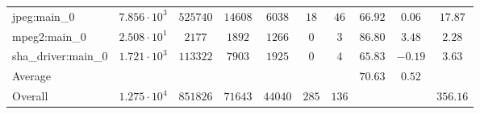 \begin{tabular}{|l|c|c|c|c|c|c|c|c|c|}
jpeg:main\_0            & $ 7.856 \cdot 10^{3} $ & $ 525740 $ & $ 14608 $ & $ 6038  $ & $ 18  $ & $ 46  $ & $ 66.92       $ & $ 0.06    $ & $ 17.87   $ \\
mpeg2:main\_0           & $ 2.508 \cdot 10^{1} $ & $ 2177   $ & $ 1892  $ & $ 1266  $ & $ 0   $ & $ 3   $ & $ 86.80       $ & $ 3.48    $ & $ 2.28    $ \\
sha\_driver:main\_0     & $ 1.721 \cdot 10^{3} $ & $ 113322 $ & $ 7903  $ & $ 1925  $ & $ 0   $ & $ 4   $ & $ 65.83       $ & $ -0.19   $ & $ 3.63    $ \\
\hline
Average                 & $                    $ & $        $ & $       $ & $       $ & $     $ & $     $ & $ 70.63       $ & $ 0.52    $ & $         $ \\
\hline
Overall                 & $ 1.275 \cdot 10^{4} $ & $ 851826 $ & $ 71643 $ & $ 44040 $ & $ 285 $ & $ 136 $ & $             $ & $         $ & $ 356.16  $ \\
\hline
\end{tabular}
